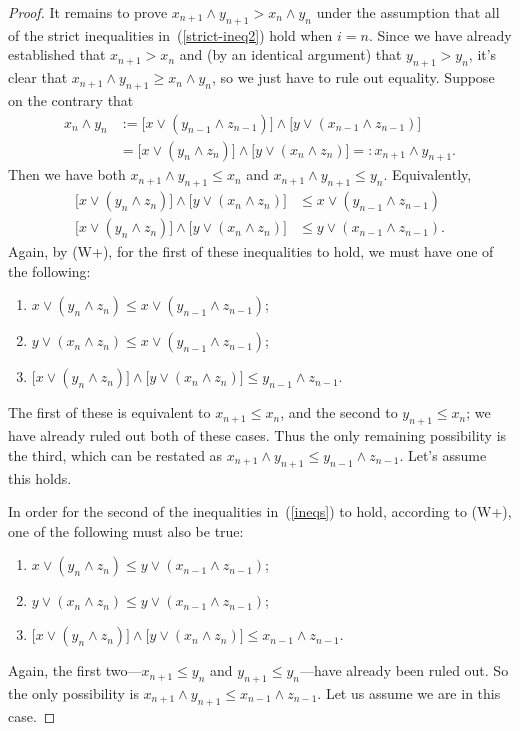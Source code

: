 \begin{proof}
It remains to prove $x_{n+1} \wedge y_{n+1} > x_n \wedge y_n$ under the assumption 
that all of the strict inequalities in~(\ref{strict-ineq2}) hold when $i=n$.
Since we have already established that $x_{n+1} > x_n$ and (by an identical argument)
that $y_{n+1} > y_n$, it's clear that $x_{n+1} \wedge y_{n+1}  \geq x_n \wedge y_n$,
so we just have to rule out equality.  Suppose on the contrary that  
\begin{align*}
x_n \wedge y_n &:= \bigl[x \vee (y_{n-1} \wedge z_{n-1})\bigr] \wedge 
\bigl[y \vee (x_{n-1} \wedge z_{n-1})\bigr]\\
&= \bigl[x \vee (y_n \wedge z_n) \bigr] \wedge \bigl[y \vee (x_n \wedge z_n)\bigr] =: x_{n+1} \wedge y_{n+1}.
\end{align*}
Then we have both $x_{n+1} \wedge y_{n+1} \leq x_{n}$ and $x_{n+1} \wedge y_{n+1} \leq y_{n}$.
Equivalently,
\begin{align}
\bigl[x \vee (y_{n} \wedge z_{n})\bigr] \wedge 
\bigl[y \vee (x_{n} \wedge z_{n})\bigr] &\leq x \vee (y_{n-1} \wedge z_{n-1})\nonumber\\
\bigl[x \vee (y_{n} \wedge z_{n})\bigr] \wedge 
\bigl[y \vee (x_{n} \wedge z_{n})\bigr] &\leq y \vee (x_{n-1} \wedge z_{n-1}).\label{ineqs}
\end{align}
Again, by (W+), for the first of these inequalities to hold, we must have one of the following:
\begin{enumerate}
\item $x \vee (y_{n} \wedge z_{n})\leq x \vee (y_{n-1} \wedge z_{n-1})$;
\item $y \vee (x_{n} \wedge z_{n}) \leq x \vee (y_{n-1} \wedge z_{n-1})$;
\item $\bigl[x \vee (y_{n} \wedge z_{n})\bigr] \wedge 
\bigl[y \vee (x_{n} \wedge z_{n})\bigr] \leq y_{n-1} \wedge z_{n-1}$.
\end{enumerate}
The first of these is equivalent to $x_{n+1} \leq x_{n}$, and the second to 
$y_{n+1} \leq x_n$; we have already ruled out both of these cases.
Thus the only remaining possibility is the third, which can be restated as 
$x_{n+1} \wedge y_{n+1} \leq y_{n-1} \wedge z_{n-1}$. Let's assume this holds.

In order for the second of the inequalities in~(\ref{ineqs}) to hold, 
according to (W+), one of the following must also be true:
\begin{enumerate}
\item $x \vee (y_{n} \wedge z_{n})\leq y \vee (x_{n-1} \wedge z_{n-1})$;
\item $y \vee (x_{n} \wedge z_{n}) \leq y \vee (x_{n-1} \wedge z_{n-1})$;
\item $\bigl[x \vee (y_{n} \wedge z_{n})\bigr] \wedge 
\bigl[y \vee (x_{n} \wedge z_{n})\bigr] \leq x_{n-1} \wedge z_{n-1}$.
\end{enumerate}
Again, the first two---$x_{n+1}\leq y_n$ and $y_{n+1} \leq y_{n}$---have already 
been ruled out. So the only possibility is
$x_{n+1} \wedge y_{n+1} \leq x_{n-1} \wedge z_{n-1}$. Let us assume we are in this case.


\end{proof}
